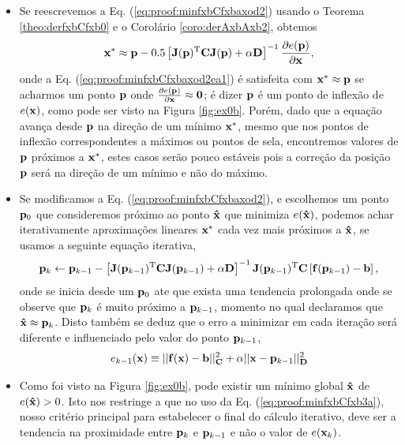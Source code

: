 \begin{myproofT}
\begin{itemize}
\item Se reescrevemos a Eq. (\ref{eq:proof:minfxbCfxbaxod2}) usando o Teorema \ref{theo:derfxbCfxb0}
e o Corolário \ref{coro:derAxbAxb2},
obtemos
\begin{equation}\label{eq:proof:minfxbCfxbaxod2ea1}
\VECTOR{x}^* \approx \VECTOR{p} -
0.5 \left[ \MATRIX{J}(\VECTOR{p})^{\transpose}\MATRIX{C} \MATRIX{J}(\VECTOR{p})+\alpha \MATRIX{D} \right]^{-1}
\frac{\partial e(\VECTOR{p})}{\partial \VECTOR{x} },
\end{equation}
onde a Eq. (\ref{eq:proof:minfxbCfxbaxod2ea1}) é satisfeita 
com $\VECTOR{x}^* \approx \VECTOR{p}$
se acharmos um  ponto $\VECTOR{p}$ onde  
$\frac{\partial e(\VECTOR{p})}{\partial \VECTOR{x} }\approx \VECTOR{0}$; 
é dizer $\VECTOR{p}$ é um ponto de inflexão de $e(\VECTOR{x})$, como pode ser visto na Figura \ref{fig:ex0b}.
Porém, dado que a equação avança desde $\VECTOR{p}$ na direção de um mínimo $\VECTOR{x}^*$, 
mesmo que nos pontos de inflexão correspondentes a máximos ou pontos de sela,
encontremos valores de $\VECTOR{p}$ próximos a $\VECTOR{x}^*$,
 estes casos serão pouco estáveis pois
a correção da posição $\VECTOR{p}$ será na direção de um mínimo e não do máximo.

\item Se modificamos a Eq. (\ref{eq:proof:minfxbCfxbaxod2}), e escolhemos um ponto  
$\VECTOR{p}_0$ que consideremos próximo ao ponto $\VECTOR{\hat{x}}$ que minimiza $e(\VECTOR{\hat{x}})$,
podemos achar iterativamente aproximações lineares $\VECTOR{x}^*$ cada vez mais próximos a  $\VECTOR{\hat{x}}$,
se usamos a seguinte equação iterativa,
\begin{equation}\label{eq:proof:minfxbCfxbaxod3b}
\VECTOR{p}_{k} \leftarrow \VECTOR{p}_{k-1} -
\left[ \MATRIX{J}(\VECTOR{p}_{k-1})^{\transpose}\MATRIX{C} \MATRIX{J}(\VECTOR{p}_{k-1}) +\alpha \MATRIX{D}\right]^{-1}
\MATRIX{J}(\VECTOR{p}_{k-1})^{\transpose}\MATRIX{C} \left[\VECTOR{f}(\VECTOR{p}_{k-1})-\VECTOR{b}\right],
\end{equation}
onde se inicia desde um $\VECTOR{p}_{0}$ 
ate que exista uma tendencia prolongada onde se observe que $\VECTOR{p}_{k}$ é muito próximo a $\VECTOR{p}_{k-1}$,
momento no qual declaramos que $\VECTOR{\hat{x}} \approx \VECTOR{p}_{k}$.
Disto também se deduz que o erro a minimizar em cada iteração será diferente e influenciado pelo valor do ponto $\VECTOR{p}_{k-1}$,
\begin{equation}
e_{k-1}(\VECTOR{x})  \equiv 
||\VECTOR{f}(\VECTOR{x})-\VECTOR{b}||_{\MATRIX{C}}^2+
\alpha||\VECTOR{x}-\VECTOR{p}_{k-1}||_{\MATRIX{D}}^2
\end{equation}
\item Como foi visto na Figura  \ref{fig:ex0b},
pode existir um mínimo global $\VECTOR{\hat{x}}$ de $e(\VECTOR{\hat{x}}) > 0$.
Isto nos restringe a que no uso da Eq. (\ref{eq:proof:minfxbCfxb3a}),
nosso critério principal para estabelecer o final do cálculo iterativo,
deve ser a tendencia na  proximidade entre $\VECTOR{p}_{k}$ e $\VECTOR{p}_{k-1}$ 
e não o valor de $e(\VECTOR{x}_k)$.
\end{itemize}~


\end{myproofT}

